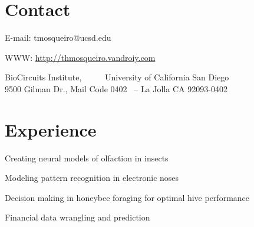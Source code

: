\documentclass[letterpaper]{resume} %
\begin{document}
\begin{minipage}[t]{0.64\textwidth} %


  \section{Contact}

  {\color{black}
  \fontsize{11pt}{11pt}
  { E-mail:} { tmosqueiro@ucsd.edu}}

  \vspace{0.1cm}
  { WWW:} \href{http://thmosqueiro.vandroiy.com}{{  http://thmosqueiro.vandroiy.com}}

  \vspace{0.3cm}
  BioCircuits Institute, \ \ \ \ \ University of California San Diego\\
  9500 Gilman Dr., Mail Code 0402 \ -- La Jolla CA 92093-0402



  \sectionspace

  \section{Experience}

  \sectionspace



  \vspace{-0.4cm}
  \vspace{\topsep} %
  \begin{tightitemize}
  \item Creating neural models of olfaction in insects
  \item Modeling pattern recognition in electronic noses
  \item Decision making in honeybee foraging for optimal hive performance
  \item Financial data wrangling and prediction
  \end{tightitemize}


\end{minipage}
\end{document}

